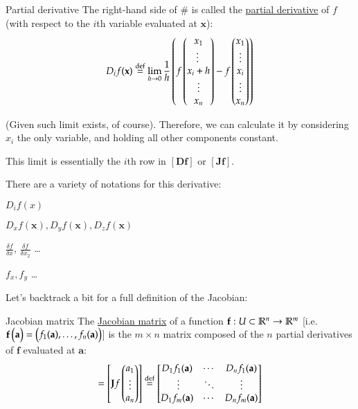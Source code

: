 \begin{defn}{Partial derivative}
The right-hand side of $\#$ is called the \ul{partial derivative} of $f$ (with respect to the $i$th variable evaluated at $\bm{x}$): 
\begin{equation}
	D_i f(\textbf{x})\overset{\text{def}}{=}\lim_{h\rightarrow 0}\frac{1}{h} \left(f\begin{pmatrix} x_1  \\ \vdots\ \\ x_i + h \\ \vdots \\ x_n \end{pmatrix} - f\begin{pmatrix} x_1 \\ \vdots \\ x_i \\ \vdots \\ x_n \end{pmatrix}\right)
\end{equation}

(Given such limit exists, of course). Therefore, we can calculate it by considering $x_i$ the only variable, and holding all other components constant.

This limit is essentially the $i$th row in $[\bm{Df}]$ or $[\bm{Jf}]$. 
\end{defn}

There are a variety of notations for this derivative:
\begin{itemize}
\begin{minipage}{0.5\linewidth}
  \item $D_i f(x)$
  \item $D_x f(\bm{x}), D_y f(\bm{x}), D_z f(\bm{x})$
\end{minipage}\begin{minipage}{0.5\linewidth}
  \item $\frac{\delta f}{\delta x}$, $\frac{\delta f}{\delta x_2}$ \dots
  \item $f_x, f_y$ \dots
  \end{minipage}
\end{itemize}

Let's backtrack a bit for a full definition of the Jacobian: 
\begin{defn}{Jacobian matrix}
	The \ul{Jacobian matrix} of a function $\textbf{f} : U\subset \mathbb{R}^n\to \mathbb{R}^m$ [i.e. $\textbf{f}\begin{pmatrix} \textbf{a} \end{pmatrix} = \begin{pmatrix} f_1(\textbf{a}),\dots,f_n(\textbf{a}) \end{pmatrix}$] is the $m \times n$ matrix composed of the $n$ partial derivatives of $\bm{f}$ evaluated at $\bm{a}$: 
\begin{equation}
	[\bm{Jf}(\bm{a})] = \mtrx{\bm{J}f\Point{a_1 \\ \vdots \\ a_n}} \Def \mtrx{D_1f_1(\bm{a}) & \cdots & D_nf_1(\bm{a}) \\ \ \vdots & \ddots & \vdots \\ D_1f_m(\bm{a}) & \cdots & D_nf_m(\bm{a})}
\end{equation}
\end{defn}


